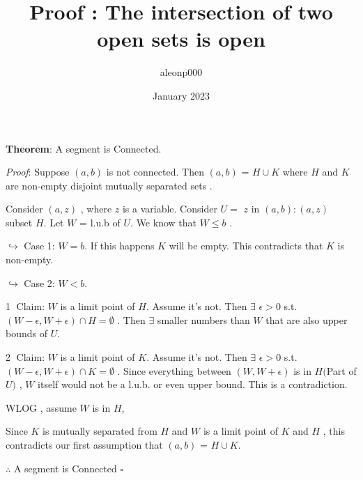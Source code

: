 \documentclass{article}
\title{Proof : The intersection of two open sets is open}
\author{aleonp000 }
\date{January 2023}
\begin{document}
\noindent
\textbf{Theorem}:  A segment is Connected.

\textit{Proof}: 
Suppose $(a,b)$ is not connected. Then $(a,b)$ = $H\cup K$ where $H$ and $K$ are non-empty disjoint mutually separated sets .
 

Consider $(a,z)$ , where $z$ is a variable. Consider $U =$ \textbraceleft$ z$ in $ (a,b) : (a,z) $ subset $H$\textbraceright . Let $W$ = l.u.b of $U$. We know that $W \leq b$ . 


$\hookrightarrow$ Case 1: $W = b$. 
If this happens $K$ will be empty. This contradicts that $K$ is non-empty.

$\hookrightarrow$ Case 2: $W < b$.

\textcircled{1} Claim:  $W$ is a limit point of $H$. Assume it's not. Then $\exists$ $\epsilon > 0$ s.t. $(W-\epsilon , W+ \epsilon )\cap H = \emptyset$ . Then $\exists$ smaller numbers than $W$ that are also upper bounds of $U$.

\textcircled{2} Claim: $W$ is a limit point of $K$. Assume it's not. Then $\exists$ $\epsilon > 0$ s.t. $(W-\epsilon , W+ \epsilon )\cap K = \emptyset$ . Since everything between $(W , W+\epsilon)$ is in $H($Part of $U)$ , $W$ itself would not be a l.u.b. or even upper bound. This is a contradiction.

WLOG , assume $W$ is in $H$,

Since $K$ is mutually separated from $H$ and $W$ is a limit point of $K$ and $H$ , this contradicts our first assumption that $(a,b)$ = $H\cup K$.





 \noindent 
 $\therefore$ A segment is Connected         \hfill                     $\square$
 
\end{document}
